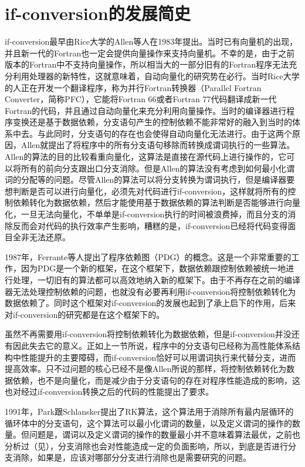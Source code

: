 \section{if-conversion的发展简史}

if-conversion最早由Rice大学的Allen等人在1983年提出\cite{allen1983Concondeptodatdep}。当时已有向量机的出现，并且新一代的Fortran也一定会提供向量操作来支持向量机。不幸的是，由于之前版本的Fortran中不支持向量操作，所以相当大的一部分旧有的Fortran程序无法充分利用处理器的新特性，这就意味着，自动向量化的研究势在必行。当时Rice大学的人正在开发一个翻译程序，称为并行Fortran转换器（Parallel Fortran Converter，简称PFC），它能将Fortran 66或者Fortran 77代码翻译成新一代Fortran的代码，并且通过自动向量化来充分利用向量操作。当时的编译器进行程序变换还是基于数据依赖，分支语句产生的控制依赖不能非常好的融入到当时的体系中去。与此同时，分支语句的存在也会使得自动向量化无法进行。由于这两个原因，Allen就提出了将程序中的所有分支语句移除而转换成谓词执行的一些算法。Allen的算法的目的比较看重向量化，这算法是直接在源代码上进行操作的，它可以将所有的前向分支跟出口分支消除。但是Allen的算法没有考虑到如何最小化谓词的分配等的问题。尽管Allen的算法可以将分支转换为谓词执行，但是编译器要想判断是否可以进行向量化，必须先对代码进行if-conversion，这样就将所有的控制依赖转化为数据依赖，然后才能使用基于数据依赖的算法判断是否能够进行向量化，一旦无法向量化，不单单是if-conversion执行的时间被浪费掉，而且分支的消除反而会对代码的执行效率产生影响，糟糕的是，if-conversion已经将代码变得面目全非无法还原。

1987年，Ferrante等人提出了程序依赖图（PDG）的概念\cite{ferrante1987prodepgraitsuseopt}。这是一个非常重要的工作，因为PDG是一个新的框架，在这个框架下，数据依赖跟控制依赖被统一地进行处理，一切旧有的算法都可以高效地纳入新的框架下。由于不再存在之前的编译器无法处理控制依赖的问题，也就没有必要再利用if-conversion将控制依赖转化为数据依赖了。同时这个框架对if-conversion的发展也起到了承上启下的作用，后来对if-conversion的研究都是在这个框架下的。

虽然不再需要用if-conversion将控制依赖转化为数据依赖，但是if-conversion并没还有因此失去它的意义。正如上一节所说，程序中的分支语句已经称为高性能体系结构中性能提升的主要障碍，而if-conversion恰好可以用谓词执行来代替分支，进而提高效率。只不过问题的核心已经不是像Allen所说的那样，将控制依赖转化为数据依赖，也不是向量化，而是减少由于分支语句的存在对程序性能造成的影响，这也对经过if-conversion转换之后的代码的性能提出了要求。

1991年，Park跟Schlansker提出了RK算法\cite{JosephC.H.Park1991}，这个算法用于消除所有最内层循环的循环体中的分支语句，这个算法可以最小化谓词的数量，以及定义谓词的操作的数量。但问题是，谓词以及定义谓词的操作的数量最小并不意味着算法最优，之前也分析过（见），分支消除也会对性能造成一定的负面影响，所以，到底是否进行分支消除，如果是，应该对哪部分分支进行消除也是需要研究的问题。

